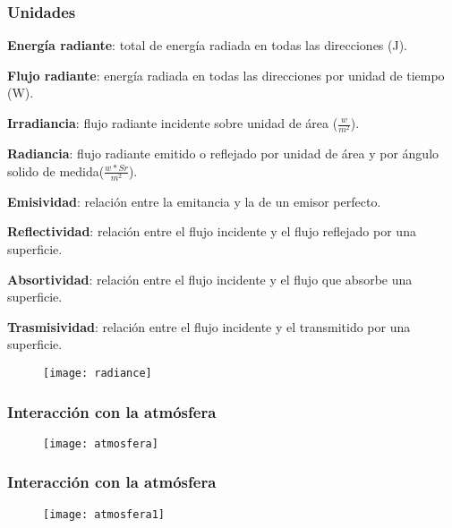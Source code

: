 \documentclass[]{beamer}
\begin{document}
\begin{frame}
\frametitle{Unidades}
\begin{itemize}
\scriptsize{
\item \textbf{Energía radiante}: total de energía radiada en todas las direcciones (J).
\item \textbf{Flujo radiante}: energía radiada en todas las direcciones por unidad de tiempo (W).
\item \textbf{Irradiancia}: flujo radiante incidente sobre unidad de área ($\frac{w}{m^2}$).
\item \textbf{Radiancia}: flujo radiante emitido o reflejado por unidad de área y por ángulo solido de medida($\frac{w*Sr}{m^2}$).
\item \textbf{Emisividad}: relación entre la emitancia y la de un emisor perfecto.
\item \textbf{Reflectividad}: relación entre el flujo incidente y el flujo reflejado por una superficie.
\item \textbf{Absortividad}: relación entre el flujo incidente y el flujo que absorbe una superficie.
\item \textbf{Trasmisividad}: relación entre el flujo incidente y el transmitido por una superficie.
}
 \begin{figure}
    \centering
    \texttt{[image: radiance]}
  \end{figure}
\end{itemize}
\end{frame}
\begin{frame}
\frametitle{Interacción con la atmósfera}
  \begin{figure}
    \centering
    \texttt{[image: atmosfera]}
  \end{figure}
\end{frame}
\begin{frame}
\frametitle{Interacción con la atmósfera}
  \begin{figure}
    \centering
    \texttt{[image: atmosfera1]}
  \end{figure}
\end{frame}
\end{document}

